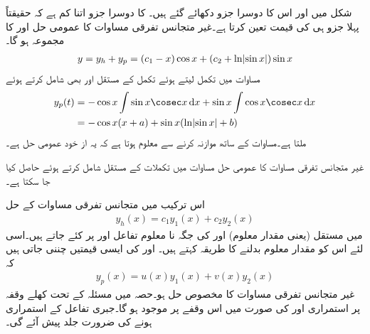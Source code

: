شکل  میں  اور اس کا دوسرا جزو دکھائے گئے ہیں۔ کا دوسرا جزو اتنا کم ہے کہ حقیقتاً پہلا جزو  ہی  کی قیمت تعین کرتا ہے۔غیر متجانس تفرقی مساوات کا عمومی حل  اور  کا مجموعہ ہو گا۔
\begin{align}\label{مساوات_سادہ_دو_مثال_متعین_متغیرات_تبدیلی_ب}
y=y_h+y_p=(c_1-x)\cos x+(c_2+\ln\abs{\sin x})\sin x
\end{align}
مساوات  میں تکمل لیتے ہوئے تکمل کے مستقل  اور  بھی شامل کرتے ہوئے
\begin{align*}
y_p(t)&=-\cos x\int \sin x \cosec x\dif x+\sin x\int \cos x \cosec x\dif x\\
&=-\cos x(x+a)+\sin x(\ln\abs{\sin x}+b)
\end{align*}
ملتا ہے۔مساوات  کے ساتھ موازنہ کرنے سے معلوم ہوتا ہے کہ یہ از خود عمومی حل ہے۔

غیر متجانس تفرقی مساوات  کا عمومی حل  مساوات  میں تکملات کے مستقل شامل کرتے ہوئے حاصل کیا جا سکتا ہے۔


اس ترکیب میں متجانس تفرقی مساوات کے حل
\begin{align*}
 y_h(x)=c_1y_1(x)+c_2y_2(x)
\end{align*}
میں مستقل (یعنی مقدار معلوم)  اور   کی جگہ نا معلوم تفاعل  اور  پر کئے جاتے ہیں۔اسی لئے اس کو مقدار معلوم بدلنے کا طریقہ کہتے ہیں۔ اور  کی ایسی قیمتیں چننی جاتی ہیں کہ
\begin{align}\label{مساوات_سادہ_دو_غیر_متجانس_خطی_ٹ}
y_p(x)=u(x)y_1(x)+v(x)y_2(x)
\end{align}
غیر متجانس تفرقی مساوات  کا مخصوص حل ہو۔حصہ  میں مسئلہ  کے تحت کھلے وقفہ  پر استمراری  اور  کی صورت میں اس وقفے پر  موجود ہو گا۔جبری تفاعل  کے استمراری ہونے کی ضرورت جلد پیش آئے گی۔

